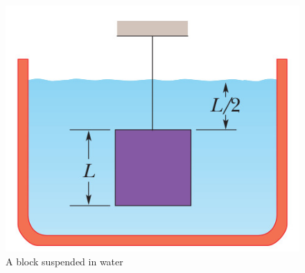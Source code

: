 \documentclass[10pt]{article}
\begin{document}
\begin{enumerate}
\begin{figure}[h]
\includegraphics[scale=.9]{suspendedblock}
\centering
\caption{A block suspended in water}
\label{suspenblock}
\centering
\end{figure}
\end{enumerate}
\end{document}
